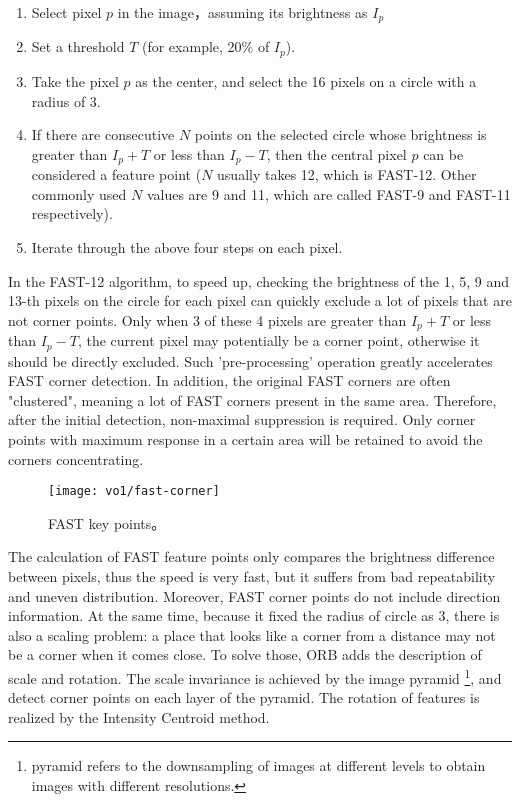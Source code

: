 \begin{enumerate}
\item Select pixel $p$ in the image，assuming its brightness as $I_{p}$
\item Set a threshold $T$ (for example, 20\% of $I_{p}$).
\item Take the pixel $p$ as the center, and select the 16 pixels on a circle with a radius of 3.
\item If there are consecutive $N$ points on the selected circle whose brightness is greater than $I_{p}+T$ or less than $I_{p}-T$, then the central pixel $p$ can be considered a feature point ($N$ usually takes 12, which is FAST-12. Other commonly used $N$ values ​​are 9 and 11, which are called FAST-9 and FAST-11 respectively).
\item Iterate through the above four steps on each pixel.
\end{enumerate}

In the FAST-12 algorithm, to speed up, checking the brightness of the 1, 5, 9 and 13-th pixels on the circle for each pixel can quickly exclude a lot of pixels that are not corner points. Only when 3 of these 4 pixels are greater than $I_{p}+T$ or less than $I_{p}-T$, the current pixel may potentially be a corner point, otherwise it should be directly excluded. Such 'pre-processing' operation greatly accelerates FAST corner detection. In addition, the original FAST corners are often "clustered", meaning a lot of FAST corners present in the same area. Therefore, after the initial detection, non-maximal suppression is required. Only corner points with maximum response in a certain area will be retained to avoid the corners concentrating.

\begin{figure}[!ht]
	\centering
	\texttt{[image: vo1/fast-corner]}
	\caption{FAST key points\textsuperscript{\cite{Rosten2006}}。}
	\label{fig:fastcorner}
\end{figure}

The calculation of FAST feature points only compares the brightness difference between pixels, thus the speed is very fast, but it suffers from bad repeatability and uneven distribution. Moreover, FAST corner points do not include direction information. At the same time, because it fixed the radius of circle as 3, there is also a scaling problem: a place that looks like a corner from a distance may not be a corner when it comes close. To solve those, ORB adds the description of scale and rotation. The scale invariance is achieved by the image pyramid \footnote{ pyramid refers to the downsampling of images at different levels to obtain images with different resolutions. }, and detect corner points on each layer of the pyramid. The rotation of features is realized by the Intensity Centroid method.

